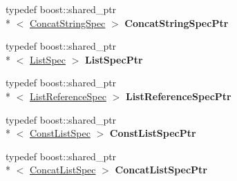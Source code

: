 \begin{DoxyCompactItemize}
\item 
\hypertarget{namespacegiskard__suturo_addc68b41852268132912644ee4200426}{typedef boost\-::shared\-\_\-ptr\\*
$<$ \hyperlink{classgiskard__suturo_1_1ConcatStringSpec}{Concat\-String\-Spec} $>$ {\bfseries Concat\-String\-Spec\-Ptr}}\label{namespacegiskard__suturo_addc68b41852268132912644ee4200426}

\item 
\hypertarget{namespacegiskard__suturo_a7fa05581125d586e08c2cb78aba69bb7}{typedef boost\-::shared\-\_\-ptr\\*
$<$ \hyperlink{classgiskard__suturo_1_1ListSpec}{List\-Spec} $>$ {\bfseries List\-Spec\-Ptr}}\label{namespacegiskard__suturo_a7fa05581125d586e08c2cb78aba69bb7}

\item 
\hypertarget{namespacegiskard__suturo_ae7d0d50e6dde63a672ab16889778280c}{typedef boost\-::shared\-\_\-ptr\\*
$<$ \hyperlink{classgiskard__suturo_1_1ListReferenceSpec}{List\-Reference\-Spec} $>$ {\bfseries List\-Reference\-Spec\-Ptr}}\label{namespacegiskard__suturo_ae7d0d50e6dde63a672ab16889778280c}

\item 
\hypertarget{namespacegiskard__suturo_a24c580d7d5d297f21c626062a0e7cae5}{typedef boost\-::shared\-\_\-ptr\\*
$<$ \hyperlink{classgiskard__suturo_1_1ConstListSpec}{Const\-List\-Spec} $>$ {\bfseries Const\-List\-Spec\-Ptr}}\label{namespacegiskard__suturo_a24c580d7d5d297f21c626062a0e7cae5}

\item 
\hypertarget{namespacegiskard__suturo_a8932eefece8493a4ee1854d703816f0b}{typedef boost\-::shared\-\_\-ptr\\*
$<$ \hyperlink{classgiskard__suturo_1_1ConcatListSpec}{Concat\-List\-Spec} $>$ {\bfseries Concat\-List\-Spec\-Ptr}}\label{namespacegiskard__suturo_a8932eefece8493a4ee1854d703816f0b}

\end{DoxyCompactItemize}
